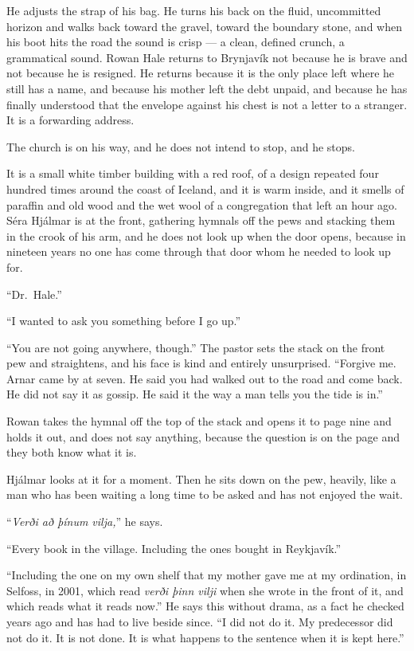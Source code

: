 \documentclass[11pt,oneside]{book}
\newcommand{\sceneline}{%
  \par\vspace{1.2em}
  \begin{center}
    \fontsize{11}{11}\selectfont \textbullet\quad\textbullet\quad\textbullet
  \end{center}
  \vspace{0.6em}\noindent\ignorespaces
}
\begin{document}
He adjusts the strap of his bag. He turns his back on the fluid,
uncommitted horizon and walks back toward the gravel, toward the
boundary stone, and when his boot hits the road the sound is crisp --- a
clean, defined crunch, a grammatical sound. Rowan Hale returns to
Brynjavík not because he is brave and not because he is resigned. He
returns because it is the only place left where he still has a name, and
because his mother left the debt unpaid, and because he has finally
understood that the envelope against his chest is not a letter to a
stranger. It is a forwarding address.

\sceneline

The church is on his way, and he does not intend to stop, and he stops.

It is a small white timber building with a red roof, of a design
repeated four hundred times around the coast of Iceland, and it is warm
inside, and it smells of paraffin and old wood and the wet wool of a
congregation that left an hour ago. Séra Hjálmar is at the front,
gathering hymnals off the pews and stacking them in the crook of his
arm, and he does not look up when the door opens, because in nineteen
years no one has come through that door whom he needed to look up for.

``Dr.~Hale.''

``I wanted to ask you something before I go up.''

``You are not going anywhere, though.'' The pastor sets the stack on the
front pew and straightens, and his face is kind and entirely unsurprised.
``Forgive me. Arnar came by at seven. He said you had walked out to the
road and come back. He did not say it as gossip. He said it the way a
man tells you the tide is in.''

Rowan takes the hymnal off the top of the stack and opens it to page
nine and holds it out, and does not say anything, because the question
is on the page and they both know what it is.

Hjálmar looks at it for a moment. Then he sits down on the pew, heavily,
like a man who has been waiting a long time to be asked and has not
enjoyed the wait.

``\emph{Verði að þínum vilja,}'' he says.

``Every book in the village. Including the ones bought in Reykjavík.''

``Including the one on my own shelf that my mother gave me at my
ordination, in Selfoss, in 2001, which read \emph{verði þinn vilji} when
she wrote in the front of it, and which reads what it reads now.'' He
says this without drama, as a fact he checked years ago and has had to
live beside since. ``I did not do it. My predecessor did not do it. It
is not done. It is what happens to the sentence when it is kept here.''
\end{document}
